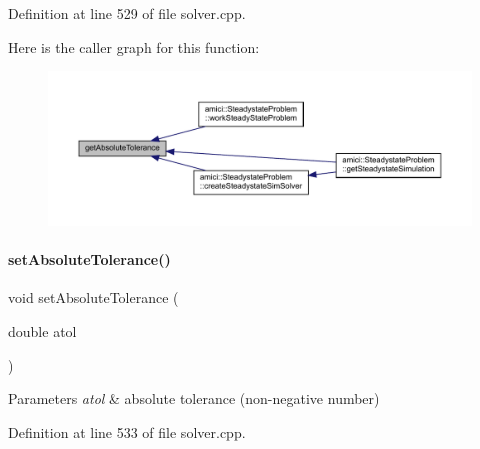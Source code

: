 Definition at line 529 of file solver.\+cpp.

Here is the caller graph for this function\+:
\nopagebreak
\begin{figure}[H]
\begin{center}
\leavevmode
\includegraphics[width=350pt]{classamici_1_1_solver_a676df944b6737474dd4ef74fe9212f3e_icgraph}
\end{center}
\end{figure}
\mbox{\label{classamici_1_1_solver_afe0fd2fad6ce110ad8421f5979945f90}} 
\paragraph{\texorpdfstring{set\+Absolute\+Tolerance()}{setAbsoluteTolerance()}}
{\footnotesize\ttfamily void set\+Absolute\+Tolerance (\begin{DoxyParamCaption}\item[{double}]{atol }\end{DoxyParamCaption})}


\begin{DoxyParams}{Parameters}
{\em atol} & absolute tolerance (non-\/negative number) \\
\hline
\end{DoxyParams}


Definition at line 533 of file solver.\+cpp.

